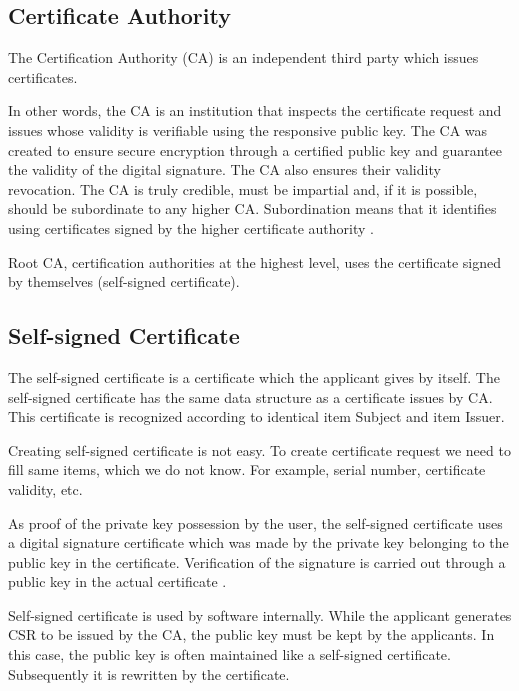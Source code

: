 \documentclass[
  digital, %
  notable,   %
  lof,     %
  lot,     %
]{fithesis3}
\begin{document}
\subsection{Certificate Authority}
The Certification Authority (CA) is an independent third party which issues certificates.

In other words, the CA is an institution that inspects the certificate request and issues whose 
validity is verifiable using the responsive public key. The CA was created %
to ensure secure encryption through a certified public key and guarantee the validity of the 
digital signature. The CA also ensures their validity revocation. The CA is truly credible, must 
be impartial and, if it is possible, should be subordinate to any higher CA. Subordination means 
that it identifies using certificates signed by the higher certificate authority 
\cite{dostalek2016velky}.

Root CA, certification authorities at the highest level, uses the certificate signed by 
themselves (self-signed certificate).

\nocite{singh2003kniha}

\subsection{Self-signed Certificate}
The self-signed certificate is a certificate which the applicant gives by itself. The 
self-signed certificate has the same data structure as a certificate issues by CA. This 
certificate is recognized according to identical item Subject and item Issuer.

Creating self-signed certificate is not easy. To create certificate request we need to fill 
same items, which we do not know. For example, serial number, certificate validity, etc.

As proof of the private key possession by the user, the self-signed certificate uses a 
digital signature certificate which was made by the private key belonging to the public key 
in the certificate. Verification of the signature is carried out through a public key in the 
actual certificate \cite{dostalek2016velky}.

Self-signed certificate is used by software internally. While the applicant generates CSR to 
be issued by the CA, the public key must be kept by the applicants. In this case, the public 
key is often maintained like a self-signed certificate. Subsequently it is rewritten by the 
certificate.
\end{document}
